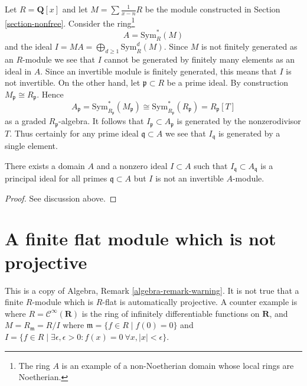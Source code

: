 \medskip\noindent
Let $R = \mathbf{Q}[x]$ and let $M = \sum \frac{1}{x - n}R$
be the module constructed in Section \ref{section-nonfree}.
Consider the ring\footnote{The ring $A$ is an example
of a non-Noetherian domain whose local rings are Noetherian.}
$$
A = \text{Sym}^*_R(M)
$$
and the ideal $I = M A = \bigoplus_{d \geq 1} \text{Sym}^d_R(M)$.
Since $M$ is not finitely generated as an $R$-module we see that
$I$ cannot be generated by finitely many elements as an ideal in $A$.
Since an invertible module is finitely generated, this means that
$I$ is not invertible.
On the other hand, let $\mathfrak p \subset R$ be a prime ideal.
By construction $M_\mathfrak p \cong R_\mathfrak p$. Hence
$$
A_\mathfrak p = \text{Sym}^*_{R_\mathfrak p}(M_\mathfrak p) \cong
\text{Sym}^*_{R_\mathfrak p}(R_\mathfrak p) =
R_\mathfrak p[T]
$$
as a graded $R_\mathfrak p$-algebra. It follows that
$I_\mathfrak p \subset A_\mathfrak p$ is generated by
the nonzerodivisor $T$.
Thus certainly for any prime ideal $\mathfrak q \subset A$
we see that $I_\mathfrak q$ is generated by a single element.

\begin{lemma}
\label{lemma-locally-principal-not-invertible}
There exists a domain $A$ and a nonzero ideal $I \subset A$
such that $I_\mathfrak q \subset A_\mathfrak q$ is a principal
ideal for all primes $\mathfrak q \subset A$ but $I$ is not an invertible
$A$-module.
\end{lemma}

\begin{proof}
See discussion above.
\end{proof}









\section{A finite flat module which is not projective}
\label{section-finite-flat-not-projective}

\noindent
This is a copy of
Algebra, Remark \ref{algebra-remark-warning}.
It is not true that a finite $R$-module which is
$R$-flat is automatically projective. A counter
example is where $R = \mathcal{C}^\infty(\mathbf{R})$
is the ring of infinitely differentiable functions on
$\mathbf{R}$, and $M = R_{\mathfrak m} = R/I$ where
$\mathfrak m = \{f \in R \mid f(0) = 0\}$ and
$I = \{f \in R \mid \exists \epsilon, \epsilon > 0 :
f(x) = 0\ \forall x, |x| < \epsilon\}$.

